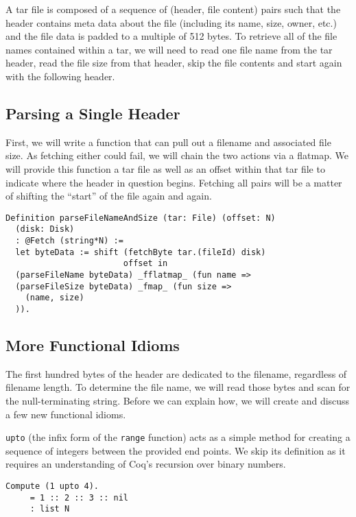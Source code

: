 \documentclass[nocopyrightspace,preprint]{sigplanconf}
\begin{document}
A tar file is composed of a sequence of (header, file content) pairs such that
the header contains meta data about the file (including its name, size, owner,
etc.) and the file data is padded to a multiple of 512 bytes. To retrieve all
of the file names contained within a tar, we will need to read one file name
from the tar header, read the file size from that header, skip the file
contents and start again with the following header.

\subsection{Parsing a Single Header}

First, we will write a function that can pull out a filename and associated
file size. As fetching either could fail, we will chain the two actions via a
flatmap. We will provide this function a tar file as well as an offset within
that tar file to indicate where the header in question begins. Fetching all
pairs will be a matter of shifting the ``start'' of the file again and again.

\begin{lstlisting}
Definition parseFileNameAndSize (tar: File) (offset: N) 
  (disk: Disk)
  : @Fetch (string*N) :=
  let byteData := shift (fetchByte tar.(fileId) disk) 
                        offset in
  (parseFileName byteData) _fflatmap_ (fun name =>
  (parseFileSize byteData) _fmap_ (fun size =>
    (name, size)
  )).
\end{lstlisting}

\subsection{More Functional Idioms}

The first hundred bytes of the header are dedicated to the filename,
regardless of filename length. To determine the file name, we will read those
bytes and scan for the null-terminating string. Before we can explain how, we
will create and discuss a few new functional idioms.

{\tt upto} (the infix form of the {\tt range} function) acts as a simple
method for creating a sequence of integers between the provided end points. We
skip its definition as it requires an understanding of Coq's recursion over
binary numbers.

\begin{lstlisting}
Compute (1 upto 4).
     = 1 :: 2 :: 3 :: nil
     : list N
\end{lstlisting}
\end{document}
